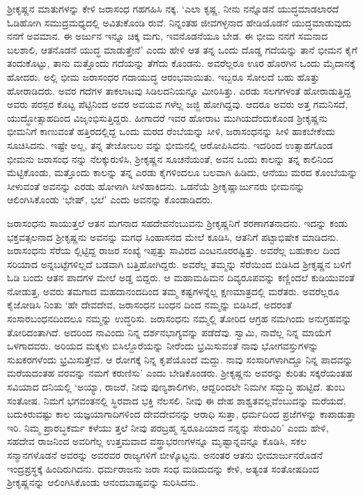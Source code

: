 ಶ್ರೀಕೃಷ್ಣನ ಮಾತುಗಳನ್ನು ಕೇಳಿ ಜರಾಸಂಧ ಗಹಗಹಿಸಿ ನಕ್ಕ. ‘ಎಲಾ ಕೃಷ್ಣ, ನೀನು ನನ್ನೊಡನೆ ಯುದ್ಧಮಾಡಲಾರದೆ ಓಡಿಹೋಗಿ ಸಮುದ್ರಮಧ್ಯದಲ್ಲಿ ಅವಿತುಕೊಂಡಿ ರುವೆ. ನಿನ್ನಂತಹ ಜೀವಗಳ್ಳನಾದ ಹೇಡಿಯೊಡನೆ ಯುದ್ಧಮಾಡುವುದು ನನಗೆ ಅವಮಾನ. ಈ ಅರ್ಜುನ ಇನ್ನೂ ಚಿಕ್ಕ ಮಗು, ಇವನೊಡನೆಯೂ ಬೇಡ. ಈ ಭೀಮ ನನಗೆ ಸಮನಾದ ಬಲಶಾಲಿ, ಆತನೊಡನೆ ಯುದ್ಧ ಮಾಡುತ್ತೇನೆ’ ಎಂದು ಹೇಳಿ ಆತ ತನ್ನ ಒಂದು ದೊಡ್ಡ ಗದೆಯನ್ನು ತಾನೆ ಭೀಮನ ಕೈಗೆ ತಂದುಕೊಟ್ಟು, ತಾನು ಮತ್ತೊಂದು ಗದೆಯನ್ನು ತೆಗೆದು ಕೊಂಡನು. ಅವರೆಲ್ಲರೂ ಊರ ಹೊರಗಿನ ಒಂದು ಮೈದಾನಕ್ಕೆ ಹೋದರು. ಅಲ್ಲಿ ಭೀಮ ಜರಾಸಂಧರ ಗದಾಯುದ್ಧ ಆರಂಭವಾಯಿತು. ಇಬ್ಬರೂ ಸೋಲದೆ ಬಹು ಹೊತ್ತು ಹೋರಾಡಿದರು. ಅವರ ಗದೆಗಳ ತಾಕಲಾಟವು ಸಿಡಿಲದನಿಯನ್ನೂ ಮೀರಿಸಿತ್ತು. ಎರಡು ಸಲಗಗಳಂತೆ ಹೋರಾಡುತ್ತಿದ್ದ ಅವರು ಪರಸ್ಪರ ಕೊಟ್ಟ ಪೆಟ್ಟಿನಿಂದ ಅವರ ಅವಯವ ಗಳೆಲ್ಲ ಜಜ್ಜಿ ಹೋಗಿದ್ದವು. ಆದರೂ ಅವರು ಅತ್ತ ಗಮನಿಸದೆ, ಯುದ್ಧೋತ್ಸಾಹದಿಂದ ವಿಜೃಂಭಿಸುತ್ತಿದ್ದರು. ಹೀಗಾದರೆ ಇವರ ಹೋರಾಟ ಮುಗಿಯದೆಂದುಕೊಂಡ ಶ್ರೀಕೃಷ್ಣನು ಭೀಮನಿಗೆ ಕಾಣುವಂತೆ ಹತ್ತಿರದಲ್ಲಿದ್ದ ಒಂದು ಮರದ ರೆಂಬೆಯನ್ನು ಸೀಳಿ, ಜರಾಸಂಧನನ್ನು ಸೀಳಿ ಹಾಕಬೇಕೆಂದು ಸೂಚಿಸಿದನು. ಇಷ್ಟೇ ಅಲ್ಲ, ತನ್ನ ತೇಜೋಬಲ ವನ್ನು ಭೀಮನಲ್ಲಿ ಆರೋಪಿಸಿದನು. ಇದರಿಂದ ಉತ್ಸಾಹಗೊಂಡ ಭೀಮನು ಜರಾಸಂಧ ನನ್ನು ನೆಲಕ್ಕುರುಳಿಸಿ, ಶ್ರೀಕೃಷ್ಣನ ಸೂಚನೆಯಂತೆ, ಅವನ ಒಂದು ಕಾಲನ್ನು ತನ್ನ ಕಾಲಿನಿಂದ ಮೆಟ್ಟಿಕೊಂಡು, ಮತ್ತೊಂದು ಕಾಲನ್ನು ತನ್ನ ಎರಡು ಕೈಗಳಿಂದಲೂ ಬಲವಾಗಿ ಹಿಡಿದು, ಆನೆಯು ಮರದ ಕೊಂಬೆಯನ್ನು ಸೀಳುವಂತೆ ಅವನನ್ನು ಎರಡು ಹೋಳಾಗಿ ಸೀಳಿಹಾಕಿದನು. ಒಡನೆಯೆ ಶ್ರೀಕೃಷ್ಣಾರ್ಜುನರು ಭೀಮನನ್ನು ಆಲಿಂಗಿಸಿಕೊಂಡು ‘ಭೇಷ್, ಭಲೆ’ ಎಂದು ಅವನನ್ನು ಕೊಂಡಾಡಿದರು.

ಜರಾಸಂಧನು ಸಾಯುತ್ತಲೆ ಆತನ ಮಗನಾದ ಸಹದೇವನೆಂಬುವನು ಶ್ರೀಕೃಷ್ಣನಿಗೆ ಶರಣಾಗತನಾದನು. ಇದನ್ನು ಕಂಡು ಭಕ್ತವತ್ಸಲನಾದ ಶ್ರೀಕೃಷ್ಣನು ಅವನನ್ನು ಮಗಧ ಸಿಂಹಾಸನದ ಮೇಲೆ ಕೂಡಿಸಿ, ಆತನಿಗೆ ಪಟ್ಟಾಭಿಷೇಕ ಮಾಡಿದನು. ಜರಾಸಂಧನು ಸೆರೆಯ ಲ್ಲಿಟ್ಟಿದ್ದ ರಾಜರ ಸಂಖ್ಯೆ ಇಪ್ಪತ್ತು ಸಾವಿರದ ಎಂಟನೂರರಷ್ಟಿತ್ತು. ಅವರೆಲ್ಲ ಬಹುಕಾಲ ದಿಂದ ಸರಿಯಾದ ಅನ್ನಬಟ್ಟೆಗಳಿಲ್ಲದೆ ಬಡವಾಗಿ ಬತ್ತಿಹೋಗಿದ್ದರು. ಅವರೆಲ್ಲ ತಮ್ಮನ್ನು ಸೆರೆಯಿಂದ ಬಿಡಿಸಿದ ಶ್ರೀಕೃಷ್ಣನ ಬಳಿಗೆ ಓಡಿ ಬಂದು ಆತನ ಪಾದಗಳ ಮೇಲೆ ಅಡ್ಡ ಬಿದ್ದರು. ಆ ಮಹಾಮಹಿಮನ ದಿವ್ಯರೂಪವನ್ನು ಕಣ್ಣಿಂದಲೆ ಕುಡಿಯುವಂತೆ ನೋಡುತ್ತ, ಅವರು ತಮಗಾದ ಮಹದಾನಂದದಿಂದ ತಮ್ಮ ಕಷ್ಟಗಳನ್ನೆಲ್ಲ ಕ್ಷಣಮಾತ್ರದಲ್ಲಿ ಮರೆತರು. ಅವರೆಲ್ಲರೂ ಕೈಜೋಡಿಸಿ ನಿಂತು ‘ಹೇ ದೇವದೇವ, ಜರಾಸಂಧನ ಬಂಧನ ದಿಂದ ನಮ್ಮನ್ನು ಬಿಡಿಸಿದೆ, ಅದರಂತೆ ಸಂಸಾರಬಂಧನದಿಂದಲೂ ನಮ್ಮನ್ನು ಉದ್ಧರಿಸು. ಜರಾಸಂಧನು ನಮ್ಮಲ್ಲಿ ತೋರಿದ ಆಗ್ರಹ ನಮಗಿಂದು ಅನುಗ್ರಹವನ್ನು ತೋರಿದಂತಾಗಿದೆ. ಅದರಿಂದ ನಾವಿಂದು ನಿನ್ನ ದರ್ಶನಭಾಗ್ಯವನ್ನು ಪಡೆದೆವು. ಸ್ವಾಮಿ, ನಾವೆಲ್ಲ ನಿನ್ನ ಮಾಯೆಗೆ ಒಳಗಾದವರು. ಅರಿಯದ ಮಕ್ಕಳು ಬಿಸಿಲ್ದೊರೆಯನ್ನು ನೀರೆಂದು ಭ್ರಮಿಸುವಂತೆ ನಾವು ಭೋಗವಸ್ತುಗಳನ್ನು ಸುಖಕರಗಳೆಂದು ಭ್ರಮಿಸುತ್ತೇವೆ. ಆ ರೋಗಕ್ಕೆ ನಿನ್ನ ಕೃಪೆಯೊಂದೆ ಮದ್ದು. ನಾವು ಸಂಸಾರಿಗಳಾಗಿದ್ದೂ ನಿನ್ನ ಪಾದವನ್ನು ಮರೆಯದಂತಹ ವರವನ್ನು ನಮಗೆ ಕರುಣಿಸು’ ಎಂದು ಬೇಡಿಕೊಂಡರು. ಶ್ರೀಕೃಷ್ಣನು ಅವರನ್ನು ಕುರಿತು ಸಕ್ಕರೆಯಂತಹ ಸವಿಯಾದ ದನಿಯಲ್ಲಿ ‘ಅಯ್ಯಾ, ರಾಜರೆ, ನೀವು ಪುಣ್ಯಶಾಲಿಗಳು, ಆದ್ದರಿಂದಲೇ ನಿಮಗೀ ಸದ್ಬುದ್ಧಿ ಹುಟ್ಟಿದೆ. ತುಂಬ ಸಂತೋಷ. ನಿಮಗೆ ಭಗವಂತನಲ್ಲಿ ಸ್ಥಿರವಾದ ಭಕ್ತಿ ನೆಲಸಲಿ. ನೀವು ಈ ದೇಹ ಶಾಶ್ವತವಲ್ಲವೆಂಬುದನ್ನು ಮರೆಯದೆ, ಬದುಕಿರುವಷ್ಟು ಕಾಲ ಯಜ್ಞಯಾಗಾದಿಗಳಿಂದ ದೇವದೇವನನ್ನು ಆರಾಧಿ ಸುತ್ತಾ, ಧರ್ಮದಿಂದ ಪ್ರಜೆಗಳನ್ನು ಕಾಪಾಡುತ್ತಾ ಇರಿ. ನಿಮ್ಮ ಪ್ರಾರಬ್ಧಕರ್ಮ ಕಳೆಯು ತ್ತಲೆ ನೀವು ಪರಬ್ರಹ್ಮ ಸ್ವರೂಪಿಯಾದ ನನ್ನನ್ನು ಸೇರುವಿರಿ’ ಎಂದು ಹೇಳಿ, ಸಹದೇವ ರಾಜನಿಂದ ಅವರಿಗೆಲ್ಲ ಉತ್ತಮವಾದ ವಸ್ತ್ರಾಭರಣಗಳನ್ನೂ ಮೃಷ್ಟಾನ್ನವನ್ನೂ ಕೊಡಿಸಿ, ಸಕಲ ಸನ್ಮಾನಗಳೊಡನೆ ಅವರನ್ನು ಅವರವರ ರಾಜ್ಯಗಳಿಗೆ ಬೀಳ್ಕೊಟ್ಟನು. ಅನಂತರ ಆತನು ಭೀಮಾರ್ಜುನರೊಡನೆ ಇಂದ್ರಪ್ರಸ್ಥಕ್ಕೆ ಹಿಂದಿರುಗಿದನು. ಧರ್ಮರಾಜನು ಜರಾ ಸಂಧ ಮಡಿದುದನ್ನು ಕೇಳಿ, ಅತ್ಯಂತ ಸಂತೋಷದಿಂದ ಶ್ರೀಕೃಷ್ಣನನ್ನು ಆಲಿಂಗಿಸಿಕೊಂಡು ಆನಂದಬಾಷ್ಪವನ್ನು ಸುರಿಸಿದನು.

